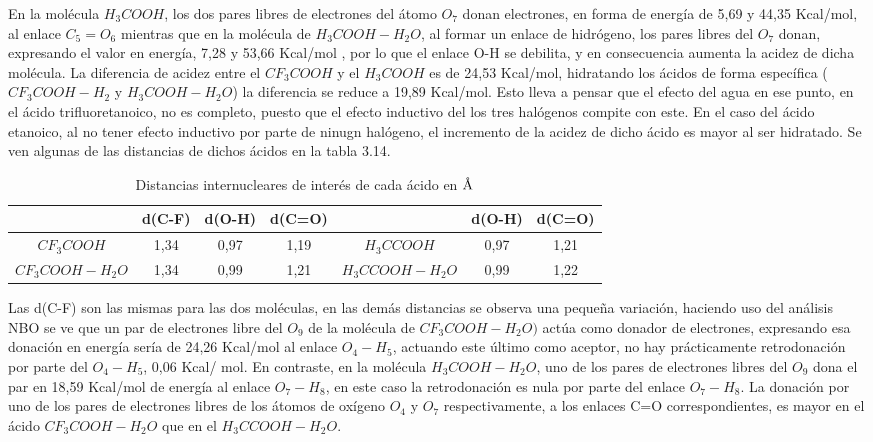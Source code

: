  En la molécula $H_3COOH$, los dos pares libres de electrones del átomo $O_7$ donan electrones, en forma de energía de 5,69 y 44,35 Kcal/mol, al enlace $C_5=O_6$ mientras que en la molécula de $H_3COOH-H_2O$, al formar un enlace de hidrógeno, los pares libres del $O_7$ donan, expresando el valor en energía, 7,28 y 53,66 Kcal/mol , por lo que el enlace O-H se debilita, y en consecuencia aumenta la acidez de dicha molécula.
 La diferencia de acidez entre el $CF_3COOH$ y el $H_3COOH$ es de 24,53 Kcal/mol, hidratando los ácidos de forma específica ($CF_3COOH-H_2$ y $H_3COOH-H_2O$) la diferencia se reduce a 19,89 Kcal/mol. Esto lleva a pensar que el efecto del agua en ese punto, en el ácido trifluoretanoico, no es completo, puesto que el efecto inductivo del los tres halógenos compite con este. En el caso del ácido etanoico, al no tener efecto inductivo por parte de ninugn halógeno, el incremento de la acidez de dicho ácido es mayor al ser hidratado.
 Se ven algunas de las distancias de dichos ácidos en la tabla 3.14.
 \begin{table}[H]
 	\centering
 	\begin{tabular}{|c|c|c|c|c|c|c|}
 		\hline
 			 & d(C-F)	& d(O-H) & d(C=O) & & d(O-H) & d(C=O) \\ \hline
$CF_3COOH$ & 1,34 & 0,97 & 1,19 & $H_3CCOOH$ & 0,97 &1,21 \\ \hline $CF_3COOH-H_2O$	& 1,34 & 0,99 & 1,21 & $H_3CCOOH-H_2O$	& 0,99 &1,22 \\ \hline
 	\end{tabular}
 \caption{Distancias internucleares de interés de cada ácido en $\mbox{\normalfont\AA}$}
 \end{table}
Las d(C-F) son las mismas para las dos moléculas, en las demás distancias se observa una pequeña variación, haciendo uso del análisis NBO se ve que un par de electrones libre del $O_9$ de la molécula de $CF_3COOH-H_2O)$ actúa como donador de electrones, expresando esa donación en energía sería de 24,26 Kcal/mol al enlace $O_4-H_5$, actuando este último como aceptor, no hay prácticamente retrodonación por parte del $O_4-H_5$, 0,06 Kcal/ mol. En contraste, en la molécula $H_3COOH-H_2O$, uno de los pares de electrones libres del $O_9$ dona el par en 18,59 Kcal/mol de energía al enlace $O_7-H_8$, en este caso la retrodonación es nula por parte del enlace $O_7-H_8$. La donación por uno de los pares de electrones libres de los átomos de oxígeno $O_4$ y $O_7$ respectivamente, a los enlaces C=O correspondientes, es mayor en el ácido $CF_3COOH-H_2O$ que en el $H_3CCOOH-H_2O$.
